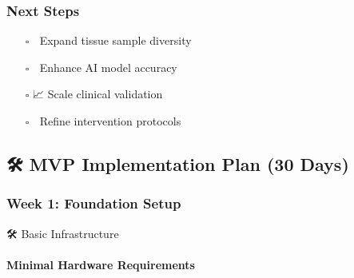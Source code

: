 \subsubsection{Next Steps}\label{next-steps}

\begin{itemize}
\tightlist
\item[$\square$]
  🧪 Expand tissue sample diversity
\item[$\square$]
  🤖 Enhance AI model accuracy
\item[$\square$]
  📈 Scale clinical validation
\item[$\square$]
  🔄 Refine intervention protocols
\end{itemize}

\subsection{🛠 MVP Implementation Plan (30
Days)}\label{mvp-implementation-plan-30-days}

\subsubsection{Week 1: Foundation Setup}\label{week-1-foundation-setup}

🛠️ Basic Infrastructure

\paragraph{Minimal Hardware
Requirements}\label{minimal-hardware-requirements}

\begin{Shaded}
\begin{Highlighting}[]
\KeywordTok{:}
\AttributeTok{  }\KeywordTok{{-}}\AttributeTok{ }\KeywordTok{:}
\AttributeTok{  }\KeywordTok{{-}}\AttributeTok{ }\KeywordTok{:}
\AttributeTok{  }\KeywordTok{{-}}\AttributeTok{ }\KeywordTok{:}

\KeywordTok{:}
\AttributeTok{  }\KeywordTok{{-}}\AttributeTok{ }\KeywordTok{:}
\AttributeTok{  }\KeywordTok{{-}}\AttributeTok{ }\KeywordTok{:}
\AttributeTok{  }\KeywordTok{{-}}\AttributeTok{ }\KeywordTok{:}
\end{Highlighting}
\end{Shaded}

